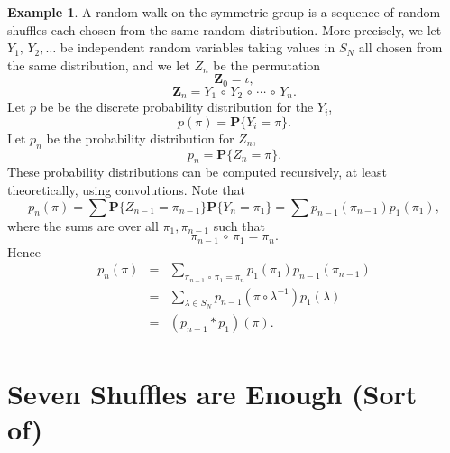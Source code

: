 \documentclass{stml-l}
\theoremstyle{definition}
\newtheorem{example}{Example}
\numberwithin{equation}{chapter}
\numberwithin{figure}{chapter}
\numberwithin{figure}{section}
\begin{document}
\begin{example}
A random walk on the symmetric group is a sequence of random shuffles each chosen from the same random distribution. More precisely, we let $Y_{1},\,Y_{2},\ldots$ be independent random variables taking values in $S_{N}$ all chosen from the same distribution, and we let $Z_{n}$ be the permutation
\begin{equation*}
\mathbf{Z}_{0}=\iota,
\end{equation*}
\begin{equation*}
\mathbf{Z}_{n}=Y_{1}\,\circ\,Y_{2}\,\circ\,\cdots\,\circ\,Y_{n}.
\end{equation*}
Let $p$ be be the discrete probability distribution for the
$Y_{i}$,
\begin{equation*}
p(\pi)=\mathbf{P}\{Y_{i}=\pi\}.
\end{equation*}
Let $p_{n}$ be the probability distribution for $Z_{n}$,
\begin{equation*}
p_{n}=\mathbf{P}\{Z_{n}=\pi\}.
\end{equation*}
These probability distributions can be computed recursively, at
least theoretically, using convolutions. Note that
\begin{equation*}
p_{n}(\pi)=\sum
\mathbf{P}\{Z_{n-1}=\pi_{n-1}\}\mathbf{P}\{Y_{n}=\pi_{1}\}=\sum
p_{n-1}(\pi_{n-1})p_{1}(\pi_{1}),
\end{equation*}
where the sums are over all $\pi_{1},\pi_{n-1}$ such that
\begin{equation*}
\pi_{n-1}\,\circ\,\pi_{1}=\pi_{n}.
\end{equation*}
Hence
\begin{equation*}
\begin{array}{lll}
p_{n}(\pi) &=& \sum\limits_{\pi_{n-1}\,\circ\,\pi_{1}=\pi_{n}}p_{1}(\pi_{1})p_{n-1}(\pi_{n-1})\\
&=& \sum\limits_{\lambda\in S_{N}}p_{n-1}(\pi\circ\lambda^{-1})p_{1}(\lambda)\\
&=& (p_{n-1}\ast p_{1})(\pi).\\
\end{array}
\end{equation*}
\end{example}


\chapter{Seven Shuffles are Enough (Sort of)\label{ch06:chap06}}
\end{document}
